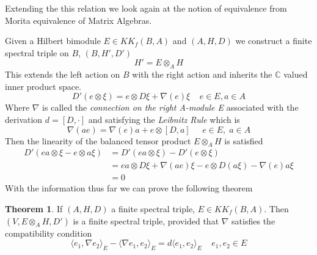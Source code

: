 \documentclass[a4paper]{article}
\theoremstyle{definition}
\theoremstyle{definition}
\theoremstyle{definition}
\theoremstyle{theorem}
\newtheorem{theorem}{Theorem}
\theoremstyle{theorem}
\begin{document}
Extending the this relation we look again at  the notion of equivalence from
Morita equivalence of Matrix Algebras.
\newline

Given a Hilbert bimodule $E \in KK_f(B, A)$ and $(A, H, D)$ we construct
a finite spectral triple on $B$, $(B, H', D')$
\begin{equation}
    H' = E \otimes _A H
\end{equation}
This extends the left action on $B$ with the right action and inherits the
$\mathbb{C}$ valued inner product space.
\begin{equation}
    D'(e\otimes \xi) = e \otimes D \xi + \nabla (e) \xi \;\;\;\; e\in
    E, a\in A
\end{equation}
Where $\nabla$ is called the \textit{connection on the right A-module E}
associated with the  derivation $d=[D, \cdot]$ and satisfying the
\textit{Leibnitz Rule} which is
\begin{equation}
    \nabla(ae) = \nabla(e)a + e \otimes [D, a] \;\;\;\;\;  e\in E,\; a\in A
\end{equation}
Then the linearity of the balanced tensor product $E \otimes _A H$ is
satisfied
\begin{align*}
    D'(ea \otimes \xi - e \otimes a \xi) &=  D'(ea \otimes \xi) - D'(e
    \otimes \xi) \\
    &= ea\otimes D\xi + \nabla(ae) \xi - e \otimes D(a\xi ) - \nabla (e)a
    \xi \\
    &= 0
\end{align*}
With the information thus far we can prove the following theorem
\begin{theorem}
    If $(A, H, D)$ a finite spectral triple, $E \in KK_f(B, A)$.
    Then $(V, E\otimes _A H, D')$ is a finite spectral triple, provided that
    $\nabla$ satisfies the compatibility condition
    \begin{equation}
        \langle e_1, \nabla e_2 \rangle _E - \langle \nabla e_1, e_2
        \rangle _E = d\langle e_1, e_2 \rangle _E \;\;\;\; e_1, e_2 \in E
    \end{equation}
\end{theorem}
\end{document}
